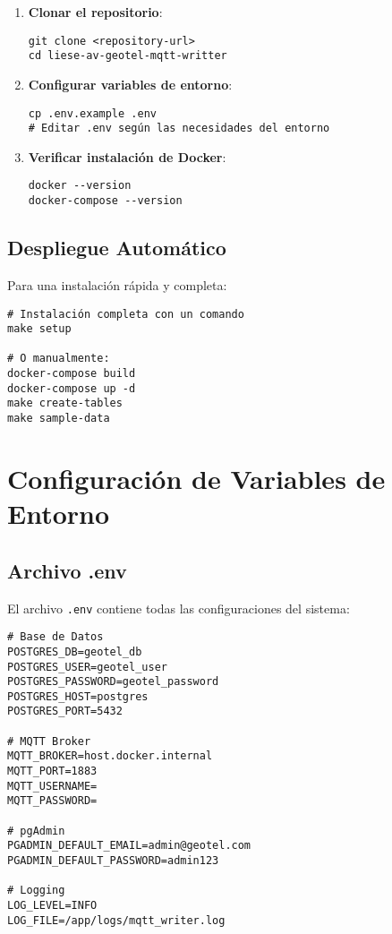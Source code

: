 \begin{enumerate}[noitemsep]
    \item \textbf{Clonar el repositorio}:
    \begin{verbatim}
git clone <repository-url>
cd liese-av-geotel-mqtt-writter
    \end{verbatim}
    
    \item \textbf{Configurar variables de entorno}:
    \begin{verbatim}
cp .env.example .env
# Editar .env según las necesidades del entorno
    \end{verbatim}
    
    \item \textbf{Verificar instalación de Docker}:
    \begin{verbatim}
docker --version
docker-compose --version
    \end{verbatim}
\end{enumerate}

\subsection{Despliegue Automático}

Para una instalación rápida y completa:

\begin{verbatim}
# Instalación completa con un comando
make setup

# O manualmente:
docker-compose build
docker-compose up -d
make create-tables
make sample-data
\end{verbatim}

\section{Configuración de Variables de Entorno}

\subsection{Archivo .env}

El archivo \texttt{.env} contiene todas las configuraciones del sistema:

\begin{verbatim}
# Base de Datos
POSTGRES_DB=geotel_db
POSTGRES_USER=geotel_user
POSTGRES_PASSWORD=geotel_password
POSTGRES_HOST=postgres
POSTGRES_PORT=5432

# MQTT Broker
MQTT_BROKER=host.docker.internal
MQTT_PORT=1883
MQTT_USERNAME=
MQTT_PASSWORD=

# pgAdmin
PGADMIN_DEFAULT_EMAIL=admin@geotel.com
PGADMIN_DEFAULT_PASSWORD=admin123

# Logging
LOG_LEVEL=INFO
LOG_FILE=/app/logs/mqtt_writer.log
\end{verbatim}

